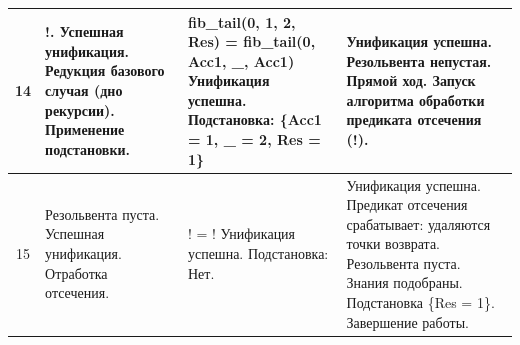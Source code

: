 \begin{tabularx}{\textwidth}{|c|>{\small}X|>{\small}X|>{\small}X|}
	14                                                                                 &
	!. \newline
	Успешная унификация. \newline
	Редукция базового случая (дно рекурсии). \newline
	Применение подстановки.                                                            &
	fib\_tail(0, 1, 2, Res) = \newline
	fib\_tail(0, Acc1, \_, Acc1) \newline
	Унификация успешна. \newline
	Подстановка: \newline
	\{Acc1 = 1, \_ = 2, Res = 1\}                                                      &
	Унификация успешна. \newline
	Резольвента непустая. \newline
	Прямой ход. \newline
	Запуск алгоритма обработки предиката отсечения (!).                                  \\
	\hline

	15                                                                                 &
	Резольвента пуста. \newline
	Успешная унификация. \newline
	Отработка отсечения.                                                               &
	! = \newline
	! \newline
	Унификация успешна. \newline
	Подстановка: \newline
	Нет.                                                                               &
	Унификация успешна. \newline
	Предикат отсечения срабатывает: удаляются точки возврата. \newline
	Резольвента пуста. \newline
	Знания подобраны. Подстановка \{Res = 1\}. \newline
	Завершение работы.                                                                   \\
	\hline
\end{tabularx}
